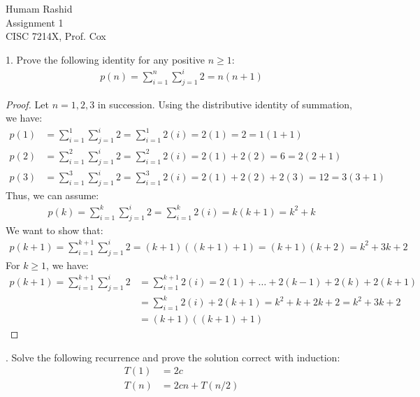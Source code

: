 \documentclass{scrartcl}
\begin{document}
\begin{flushleft}

    Humam Rashid\\
    Assignment 1\\
    CISC 7214X, Prof. Cox\\
    \bigskip
    
    1. Prove the following identity for any positive $n \geq 1$:
    \begin{align*}
        p(n) = \sum_{i=1}^{n}\sum_{j=1}^{i} 2 = n (n + 1)
    \end{align*}
    \begin{proof}
        Let $n = 1,2,3$ in succession. Using the distributive identity of summation, we have:
        \begin{align*}
            p(1) &= \sum_{i=1}^{1}\sum_{j=1}^{i} 2 = \sum_{i=1}^{1} 2(i) = 2(1) = 2 = 1(1 + 1)\\
            p(2) &= \sum_{i=1}^{2}\sum_{j=1}^{i} 2 = \sum_{i=1}^{2} 2(i) = 2(1) + 2(2) = 6
            = 2(2 + 1)\\
            p(3) &= \sum_{i=1}^{3}\sum_{j=1}^{i} 2 = \sum_{i=1}^{3} 2(i) = 2(1) + 2(2) + 2(3) = 12
            = 3(3 + 1)
        \end{align*}
        Thus, we can assume:
        \begin{align*}
            p(k) = \sum_{i=1}^{k}\sum_{j=1}^{i} 2 = \sum_{i=1}^{k} 2(i) = k(k + 1) = k^2 + k
        \end{align*}
        We want to show that:
        \begin{align*}
            p(k + 1) = \sum_{i=1}^{k + 1}\sum_{j=1}^{i} 2 = (k + 1) ((k + 1) + 1) = (k + 1) (k + 2) = k^2 + 3k + 2
        \end{align*}
        For $k \geq 1$, we have:
        \begin{align*}
            p(k + 1) = \sum_{i=1}^{k + 1}\sum_{j=1}^{i} 2 &= \sum_{i=1}^{k+1} 2(i) = 2(1) + \ldots
            + 2(k - 1) + 2(k) + 2(k + 1) \\
            &= \sum_{i=1}^{k} 2(i) + 2(k + 1) = k^2 + k + 2k + 2 = k^2 + 3k + 2 \\
            &= (k + 1) ((k + 1) + 1)
        \end{align*}
    \end{proof}
    . Solve the following recurrence and prove the solution correct with induction:
    \begin{align*}
        T(1) &= 2c\\
        T(n) &= 2cn + T(n/2)
    \end{align*}

\end{flushleft}
\end{document}
